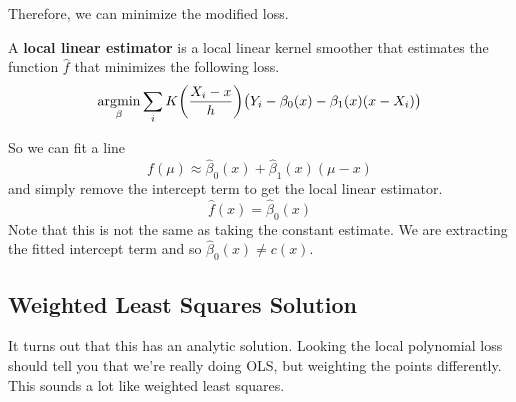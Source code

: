   Therefore, we can minimize the modified loss. 

  \begin{definition}
    \label{def:local-polynomial-estimator}
    A \textbf{local linear estimator} is a local linear kernel smoother that estimates the function $\hat{f}$ that minimizes the following loss. 
    \begin{equation}
      \operatorname*{\arg\!\min}_{\beta} \sum_i K \bigg( \frac{X_i - x}{h} \bigg) \big( Y_i - \beta_0 (x) - \beta_1 (x) (x- X_i)\big)
    \end{equation}
  \end{definition}

  So we can fit a line 
  \begin{equation}
    f(\mu) \approx \hat{\beta}_0 (x) + \hat{\beta}_1 (x) (\mu - x)
  \end{equation}
  and simply remove the intercept term to get the local linear estimator. 
  \begin{equation}
    \hat{f}(x) = \hat{\beta}_0 (x)
  \end{equation}
  Note that this is not the same as taking the constant estimate. We are extracting the fitted intercept term and so $\hat{\beta}_0(x) \neq c(x)$. 

\subsection{Weighted Least Squares Solution}

  It turns out that this has an analytic solution. Looking the local polynomial loss should tell you that we're really doing OLS, but weighting the points differently. This sounds a lot like weighted least squares. 

